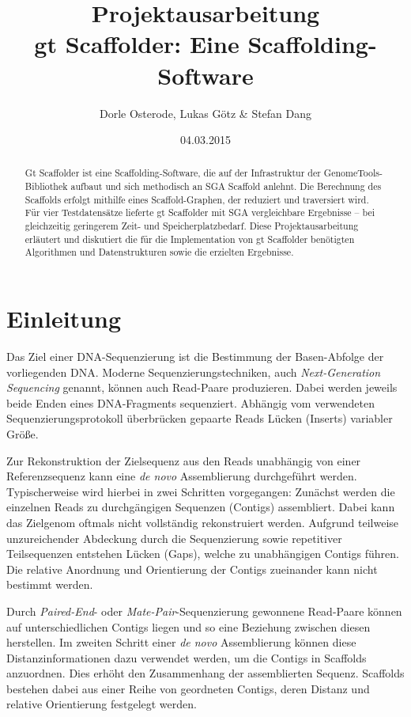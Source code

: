 \documentclass[a4paper,11pt,parskip,abstract=on]{scrartcl}
\title{Projektausarbeitung \\\vspace{.5cm} \large gt Scaffolder: Eine Scaffolding-Software}
\author{Dorle Osterode, Lukas Götz \& Stefan Dang}
\date{04.03.2015}
\begin{document}
\maketitle{}
\thispagestyle{empty}
\begin{abstract}
Gt Scaffolder ist eine Scaffolding-Software, die auf der Infrastruktur der
GenomeTools-Bibliothek aufbaut und sich methodisch an SGA Scaffold anlehnt.
Die Berechnung des Scaffolds erfolgt mithilfe eines Scaffold-Graphen, der
reduziert und traversiert wird. Für vier Testdatensätze lieferte gt Scaffolder
mit SGA vergleichbare Ergebnisse -- bei gleichzeitig geringerem Zeit-
und Speicherplatzbedarf.
Diese Projektausarbeitung erläutert und diskutiert die für die Implementation
von gt Scaffolder benötigten Algorithmen und Datenstrukturen sowie die
erzielten Ergebnisse.
\end{abstract}

\newpage{}
\thispagestyle{empty}
\tableofcontents{}
\newpage{}
\setcounter{page}{1}
\section{Einleitung}

Das Ziel einer DNA-Sequenzierung ist die Bestimmung der Basen-Abfolge
der vorliegenden DNA. Moderne Sequenzierungstechniken, auch
\textit{Next-Generation Sequencing} genannt, können auch Read-Paare
produzieren. Dabei werden jeweils beide Enden eines DNA-Fragments
sequenziert. Abhängig vom verwendeten Sequenzierungsprotokoll
überbrücken gepaarte Reads Lücken (Inserts) variabler Größe.

Zur Rekonstruktion der Zielsequenz aus den Reads unabhängig von einer
Referenzsequenz kann eine \textit{de novo} Assemblierung durchgeführt
werden. Typischerweise wird hierbei in zwei Schritten vorgegangen:
Zunächst werden die einzelnen Reads zu durchgängigen Sequenzen
(Contigs) assembliert. Dabei kann das Zielgenom oftmals nicht
vollständig rekonstruiert werden. Aufgrund teilweise unzureichender
Abdeckung durch die Sequenzierung sowie repetitiver Teilsequenzen
entstehen Lücken (Gaps), welche zu unabhängigen Contigs führen. Die
relative Anordnung und Orientierung der Contigs zueinander kann nicht
bestimmt werden.

Durch \textit{Paired-End}- oder \textit{Mate-Pair}-Sequenzierung
gewonnene Read-Paare können auf unterschiedlichen Contigs liegen und
so eine Beziehung zwischen diesen herstellen. Im zweiten Schritt einer
\textit{de novo} Assemblierung können diese Distanzinformationen dazu
verwendet werden, um die Contigs in Scaffolds anzuordnen. Dies erhöht
den Zusammenhang der assemblierten Sequenz. Scaffolds bestehen
dabei aus einer Reihe von geordneten Contigs, deren Distanz und
relative Orientierung festgelegt werden.
\end{document}
